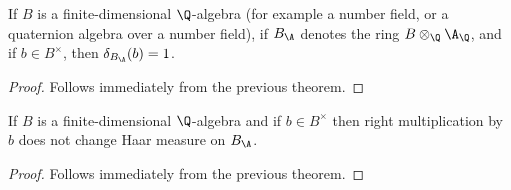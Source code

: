   \begin{corollary}
    \label{NumberField.AdeleRing.units_mem_ringHaarCharacter_ker}
    If $B$ is a finite-dimensional $\Q$-algebra (for example a number field, or a quaternion algebra over a number field),
    if $B_{\A}$ denotes the ring $B\otimes_{\Q}\A_{\Q}$, and if $b\in B^\times$,
    then $\delta_{B_{\A}}(b)=1$.
  \end{corollary}
  \begin{proof}
    Follows immediately from the previous theorem.
  \end{proof}

  \begin{corollary}
    \label{NumberField.AdeleRing.addEquivAddHaarChar_mulRight_unit_eq_one}
    If $B$ is a finite-dimensional $\Q$-algebra and
    if $b\in B^\times$ then right multiplication by $b$
    does not change Haar measure on $B_{\A}$.
  \end{corollary}
  \begin{proof}
    Follows immediately from the previous theorem.
  \end{proof}
